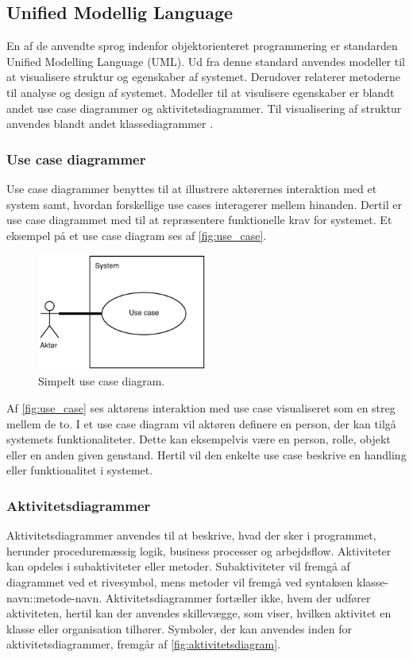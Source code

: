 \subsection{Unified Modellig Language}
En af de anvendte sprog indenfor objektorienteret programmering er standarden Unified Modelling Language (UML). Ud fra denne standard anvendes modeller til at visualisere struktur og egenskaber af systemet. Derudover relaterer metoderne til analyse og design af systemet. Modeller til at visulisere egenskaber er blandt andet use case diagrammer og aktivitetsdiagrammer. Til visualisering af struktur anvendes blandt andet klassediagrammer \cite{Fowler2004, Williams2004}.


\subsubsection{Use case diagrammer} 
Use case diagrammer benyttes til at illustrere aktørernes interaktion med et system samt, hvordan forskellige use cases interagerer mellem hinanden. Dertil er use case diagrammet med til at repræsentere funktionelle krav for systemet. \cite{Williams2004} Et eksempel på et use case diagram ses af \autoref{fig:use_case}.

\begin{figure} [H]
\centering
\includegraphics[width=0.5\textwidth]{figures/USE_CASE2}
\caption{Simpelt use case diagram.}
\label{fig:use_case}
\end{figure}

\noindent
Af \autoref{fig:use_case} ses aktørens interaktion med use case visualiseret som en streg mellem de to. I et use case diagram vil aktøren definere en person, der kan tilgå systemets funktionaliteter. Dette kan eksempelvis være en person, rolle, objekt eller en anden given genstand. Hertil vil den enkelte use case beskrive en handling eller funktionalitet i systemet.\cite{Fowler2004, Williams2004}


\subsubsection{Aktivitetsdiagrammer} 
Aktivitetsdiagrammer anvendes til at beskrive, hvad der sker i programmet, herunder proceduremæssig logik, business processer og arbejdsflow. Aktiviteter kan opdeles i subaktiviteter eller metoder. Subaktiviteter vil fremgå af diagrammet ved et rivesymbol, mens metoder vil fremgå ved syntaksen klasse-navn::metode-navn. Aktivitetsdiagrammer fortæller ikke, hvem der udfører aktiviteten, hertil kan der anvendes skillevægge, som viser, hvilken aktivitet en klasse eller organisation tilhører. Symboler, der kan anvendes inden for aktivitetsdiagrammer, fremgår af \autoref{fig:aktivitetsdiagram}.

